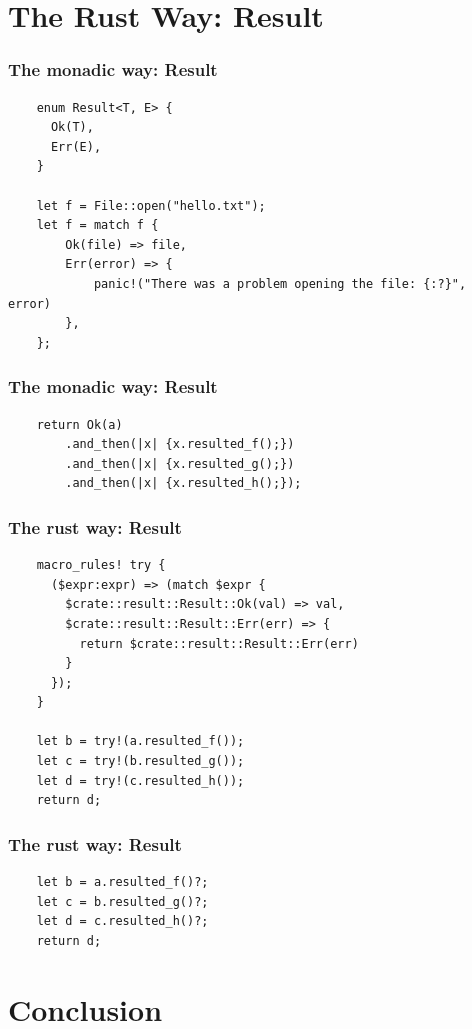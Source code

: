 \documentclass[lualatex]{beamer}
\begin{document}
\section{The Rust Way: Result}

\begin{frame}[fragile]
  \frametitle{The monadic way: Result}
  \begin{verbatim}
    enum Result<T, E> {
      Ok(T),
      Err(E),
    }

    let f = File::open("hello.txt");
    let f = match f {
        Ok(file) => file,
        Err(error) => {
            panic!("There was a problem opening the file: {:?}", error)
        },
    };
  \end{verbatim}
\end{frame}

\begin{frame}[fragile]
  \frametitle{The monadic way: Result}
  \begin{verbatim}
    return Ok(a)
        .and_then(|x| {x.resulted_f();})
        .and_then(|x| {x.resulted_g();})
        .and_then(|x| {x.resulted_h();});
  \end{verbatim}
\end{frame}

\begin{frame}[fragile]
  \frametitle{The rust way: Result}
  \begin{verbatim}
    macro_rules! try {
      ($expr:expr) => (match $expr {
        $crate::result::Result::Ok(val) => val,
        $crate::result::Result::Err(err) => {
          return $crate::result::Result::Err(err)
        }
      });
    }
    
    let b = try!(a.resulted_f());
    let c = try!(b.resulted_g());
    let d = try!(c.resulted_h());
    return d;
  \end{verbatim}
\end{frame}

\begin{frame}[fragile]
  \frametitle{The rust way: Result}
  \begin{verbatim}
    let b = a.resulted_f()?;
    let c = b.resulted_g()?;
    let d = c.resulted_h()?;
    return d;
  \end{verbatim}
\end{frame}

\section{Conclusion}
\end{document}
